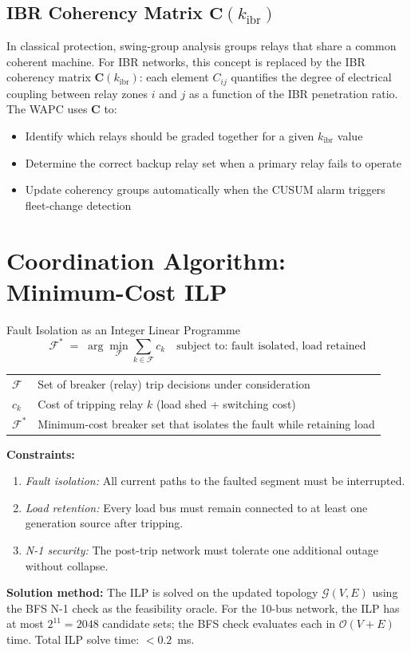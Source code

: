\documentclass[12pt,a4paper]{article}
\newcommand{\kibr}{k_\mathrm{ibr}}
\begin{document}
\subsection{IBR Coherency Matrix $\mathbf{C}(\kibr)$}

In classical protection, swing-group analysis groups relays that share a common coherent machine. For IBR networks, this concept is replaced by the IBR coherency matrix $\mathbf{C}(\kibr)$: each element $C_{ij}$ quantifies the degree of electrical coupling between relay zones $i$ and $j$ as a function of the IBR penetration ratio. The WAPC uses $\mathbf{C}$ to:
\begin{itemize}[nosep]
  \item Identify which relays should be graded together for a given $\kibr$ value
  \item Determine the correct backup relay set when a primary relay fails to operate
  \item Update coherency groups automatically when the CUSUM alarm triggers fleet-change detection
\end{itemize}

\section{Coordination Algorithm: Minimum-Cost ILP}

\begin{formulabox}{Fault Isolation as an Integer Linear Programme}
\[
  \mathcal{F}^* \;=\; \arg\min_{\mathcal{F}} \sum_{k \in \mathcal{F}} c_k
  \quad \text{subject to: fault isolated, load retained}
\]

\medskip
\begin{tabular}{@{}ll@{}}
$\mathcal{F}$   & Set of breaker (relay) trip decisions under consideration \\
$c_k$           & Cost of tripping relay $k$ (load shed + switching cost) \\
$\mathcal{F}^*$ & Minimum-cost breaker set that isolates the fault while retaining load \\
\end{tabular}

\medskip
\textbf{Constraints:}
\begin{enumerate}[nosep]
  \item \textit{Fault isolation:} All current paths to the faulted segment must be interrupted.
  \item \textit{Load retention:} Every load bus must remain connected to at least one generation source after tripping.
  \item \textit{N-1 security:} The post-trip network must tolerate one additional outage without collapse.
\end{enumerate}

\textbf{Solution method:} The ILP is solved on the updated topology $\mathcal{G}(V,E)$ using the BFS N-1 check as the feasibility oracle. For the 10-bus network, the ILP has at most $2^{11} = 2048$ candidate sets; the BFS check evaluates each in $\mathcal{O}(V+E)$ time. Total ILP solve time: $< 0.2$~ms.
\end{formulabox}
\end{document}
